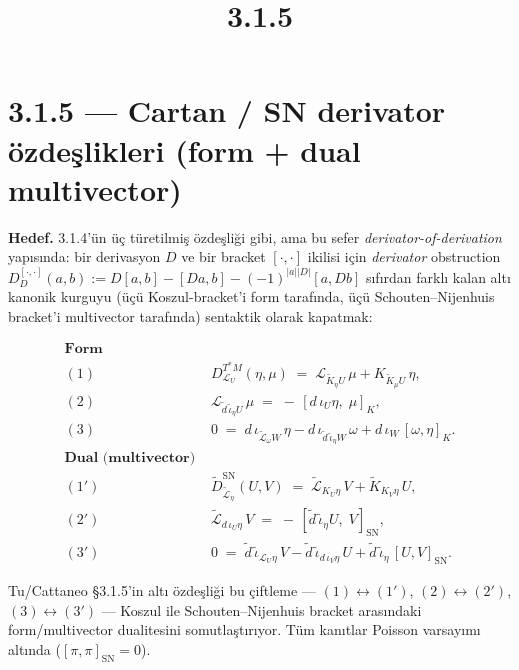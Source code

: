 \documentclass[11pt]{article}
\title{3.1.5}
\begin{document}
    
    \maketitle
    
    

    
    \section{3.1.5 --- Cartan / SN derivator özdeşlikleri (form + dual
multivector)}\label{cartan-sn-derivator-uxf6zdeux15flikleri-form-dual-multivector}

\textbf{Hedef.} 3.1.4'ün üç türetilmiş özdeşliği gibi, ama bu sefer
\emph{derivator-of-derivation} yapısında: bir derivasyon \(D\) ve bir
bracket \([\cdot,\cdot]\) ikilisi için \emph{derivator} obstruction
\(D^{[\cdot,\cdot]}_D(a,b) := D[a,b] - [Da, b] - (-1)^{|a||D|}[a, Db]\)
sıfırdan farklı kalan altı kanonik kurguyu (üçü Koszul-bracket'i form
tarafında, üçü Schouten--Nijenhuis bracket'i multivector tarafında)
sentaktik olarak kapatmak:

\[
\begin{aligned}
\textbf{Form } &\\
(1)\;& D^{T^{*}M}_{\mathcal{L}_U}(\eta, \mu)
       \;=\; \mathcal{L}_{\tilde{K}_\eta U}\,\mu + K_{\tilde{K}_\mu U}\,\eta, \\
(2)\;& \mathcal{L}_{\tilde{d}\,\tilde{\iota}_\eta U}\,\mu
       \;=\; -\,[d\,\iota_U \eta,\;\mu]_K, \\
(3)\;& 0 \;=\; d\,\iota_{\tilde{\mathcal{L}}_\omega W}\,\eta
       - d\,\iota_{\tilde{d}\,\tilde{\iota}_\eta W}\,\omega
       + d\,\iota_W\,[\omega, \eta]_K. \\[4pt]
\textbf{Dual (multivector) } &\\
(1')\;& \tilde{D}^{\mathrm{SN}}_{\tilde{\mathcal{L}}_\eta}(U, V)
       \;=\; \tilde{\mathcal{L}}_{K_U \eta}\,V + \tilde{K}_{K_V \eta}\,U, \\
(2')\;& \tilde{\mathcal{L}}_{d\,\iota_U \eta}\,V
       \;=\; -\,[\tilde{d}\,\tilde{\iota}_\eta U,\;V]_{\mathrm{SN}}, \\
(3')\;& 0 \;=\; \tilde{d}\,\tilde{\iota}_{\mathcal{L}_U \eta}\,V
       - \tilde{d}\,\tilde{\iota}_{d\,\iota_V \eta}\,U
       + \tilde{d}\,\tilde{\iota}_\eta\,[U, V]_{\mathrm{SN}}.
\end{aligned}
\]

Tu/Cattaneo §3.1.5'in altı özdeşliği bu çiftleme ---
\((1)\leftrightarrow(1')\), \((2)\leftrightarrow(2')\),
\((3)\leftrightarrow(3')\) --- Koszul ile Schouten--Nijenhuis bracket
arasındaki form/multivector dualitesini somutlaştırıyor. Tüm kanıtlar
Poisson varsayımı altında (\([\pi,\pi]_{\mathrm{SN}} = 0\)).
\end{document}
